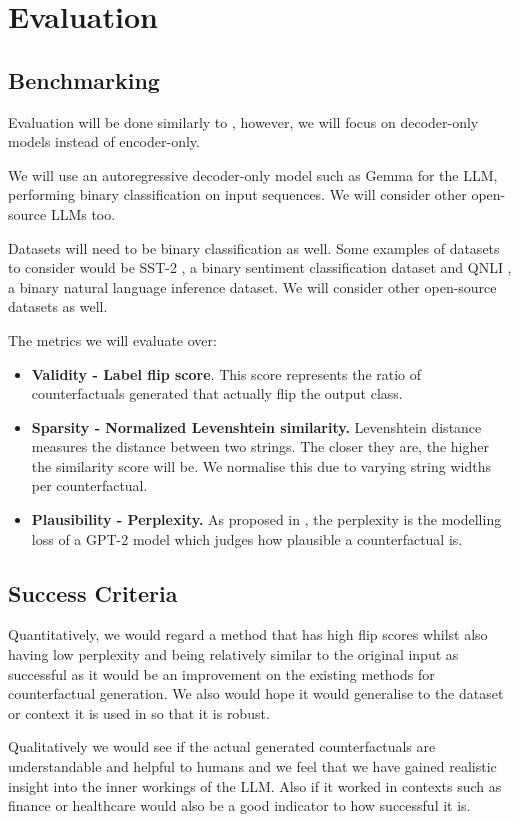 \chapter{Evaluation}
\section{Benchmarking}
Evaluation will be done similarly to \cite{mcaleese_comparative_2024}, however, we will focus on decoder-only models instead of encoder-only.

We will use an autoregressive decoder-only model such as Gemma \cite{mesnard_gemma_2024} for the LLM, performing binary classification on input sequences. We will consider other open-source LLMs too.

Datasets will need to be binary classification as well. Some examples of datasets to consider would be SST-2 \cite{socher2013recursive}, a binary sentiment classification dataset and QNLI \cite{wang2019gluemultitaskbenchmarkanalysis}, a binary natural language inference dataset. We will consider other open-source datasets as well.

The metrics we will evaluate over:
\begin{itemize}
    \item \textbf{Validity - Label flip score}. This score represents the ratio of counterfactuals generated that actually flip the output class.
    \item \textbf{Sparsity - Normalized Levenshtein similarity.} Levenshtein \cite{haldar_levenshtein_2011} distance measures the distance between two strings. The closer they are, the higher the similarity score will be. We normalise this due to varying string widths per counterfactual.
    \item \textbf{Plausibility - Perplexity.} As proposed in \cite{pope_text_2021}, the perplexity is the modelling loss of a GPT-2 model which judges how plausible a counterfactual is.
\end{itemize}

\section{Success Criteria}
Quantitatively, we would regard a method that has high flip scores whilst also having low perplexity and being relatively similar to the original input as successful as it would be an improvement on the existing methods for counterfactual generation. We also would hope it would generalise to the dataset or context it is used in so that it is robust.

Qualitatively we would see if the actual generated counterfactuals are understandable and helpful to humans and we feel that we have gained realistic insight into the inner workings of the LLM. Also if it worked in contexts such as finance or healthcare would also be a good indicator to how successful it is.